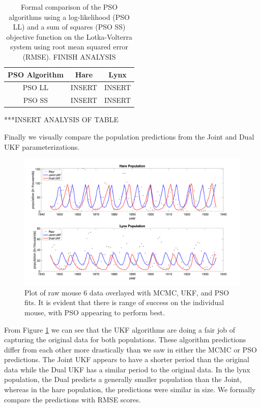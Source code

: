 \begin{table}[H]
\centering
        \begin{tabular}{c | c c}
            \cline{1-3}
            \textbf{PSO Algorithm}  &\textbf{Hare} & \textbf{Lynx}\\
            \hline
            PSO LL & INSERT & INSERT \\
            PSO SS & INSERT & INSERT
             \\\hline
            \hline
        \end{tabular}
    \caption{Formal comparison of the PSO algorithms using a log-likelihood (PSO LL) and a sum of squares (PSO SS) objective function on the Lotka-Volterra system using root mean squared error (RMSE). FINISH ANALYSIS}
    \label{tab:LVpso}
\end{table}
***INSERT ANALYSIS OF TABLE
\par Finally we visually compare the population predictions from the Joint and Dual UKF parameterizations.
\begin{figure}[H]
    \centering
    \includegraphics[width=15cm]{Final_Paper_Pieces/LV_Comparison_Figs/LVUKF.png}
    \caption{Plot of raw mouse 6 data overlayed with MCMC, UKF, and PSO fits. It is evident that there is range of success on the individual mouse, with PSO appearing to perform best.}
    \label{fig:LVukf}
\end{figure}
From Figure \ref{fig:LVukf} we can see that the UKF algorithms are doing a fair job of capturing the original data for both populations. These algorithm predictions differ from each other more drastically than we saw in either the MCMC or PSO predictions. The Joint UKF appears to have a shorter period than the original data while the Dual UKF has a similar period to the original data. In the lynx population, the Dual predicts a generally smaller population than the Joint, whereas in the hare population, the predictions were similar in size. We formally compare the predictions with RMSE scores.
